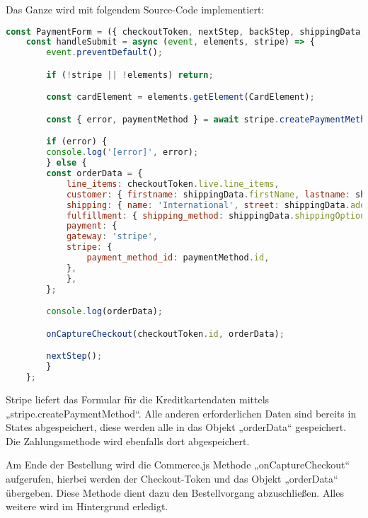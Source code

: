 Das Ganze wird mit folgendem Source-Code implementiert:

\begin{lstlisting}[language=JavaScript, caption=Implementierung von Stripe]
    const PaymentForm = ({ checkoutToken, nextStep, backStep, shippingData, onCaptureCheckout }) => {
    const handleSubmit = async (event, elements, stripe) => {
        event.preventDefault();

        if (!stripe || !elements) return;

        const cardElement = elements.getElement(CardElement);

        const { error, paymentMethod } = await stripe.createPaymentMethod({ type: 'card', card: cardElement });

        if (error) {
        console.log('[error]', error);
        } else {
        const orderData = {
            line_items: checkoutToken.live.line_items,
            customer: { firstname: shippingData.firstName, lastname: shippingData.lastName, email: shippingData.email },
            shipping: { name: 'International', street: shippingData.address1, town_city: shippingData.city, county_state: shippingData.shippingSubdivision, postal_zip_code: shippingData.zip, country: shippingData.shippingCountry },
            fulfillment: { shipping_method: shippingData.shippingOption },
            payment: {
            gateway: 'stripe',
            stripe: {
                payment_method_id: paymentMethod.id,
            },
            },
        };

        console.log(orderData);

        onCaptureCheckout(checkoutToken.id, orderData);

        nextStep();
        }
    };
\end{lstlisting}

Stripe liefert das Formular für die Kreditkartendaten mittels „stripe.createPaymentMethod“. Alle anderen erforderlichen Daten sind bereits in States abgespeichert, diese werden alle in das Objekt „orderData“ gespeichert. Die Zahlungsmethode wird ebenfalls dort abgespeichert. 

Am Ende der Bestellung  wird die Commerce.js Methode „onCaptureCheckout“ aufgerufen, hierbei werden der Checkout-Token und das Objekt „orderData“ übergeben. Diese Methode dient dazu den Bestellvorgang abzuschließen. Alles weitere wird im Hintergrund erledigt.